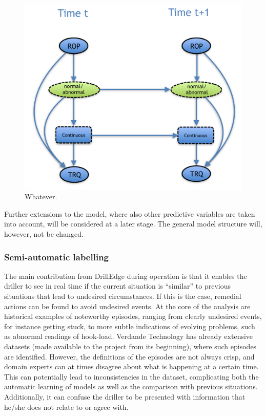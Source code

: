 \begin{figure}
\begin{center}
\includegraphics[scale=0.5]{./figures/VT_Scenario1} 
\caption{\label{Figure:VTEraticTorqueMarked}  Whatever.}
\end{center}
\end{figure}


Further extensions to the model, where also other predictive variables are taken into account, will be considered at a later stage. The general model structure will, however, not be changed.









\subsubsection{Semi-automatic labelling}\label{SubSection:SemiAutomaticLabelling}

The main contribution from DrillEdge during operation is that it enables the driller to see in real time if the current situation is ``similar'' to previous situations that lead to undesired circumstances. 
If this is the case, remedial actions can be found to avoid undesired events. 
At the core of the analysis are historical examples of noteworthy episodes, ranging from clearly undesired events, for instance getting stuck, to more subtle indications of evolving problems, such as abnormal readings of hook-load. 
Verdande Technology has already extensive datasets (made available to the project from its beginning), where such episodes are identified. 
However, the definitions of the episodes are not always crisp, and domain experts can at times disagree about what is happening at a certain time. 
This can potentially lead to inconsistencies in the dataset, complicating both the automatic learning of models as well as the comparison with previous situations. 
Additionally, it can confuse the driller to be presented with information that he/she does not relate to or agree with.

